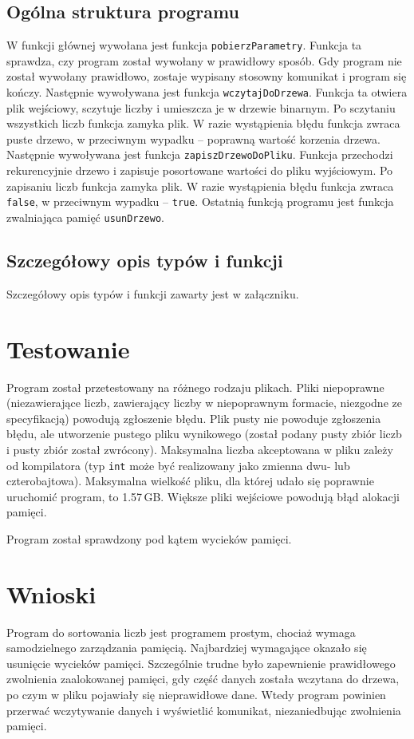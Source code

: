 \documentclass[12pt,a4paper,twoside]{article}
\begin{document}
\subsection{Ogólna struktura programu}
W funkcji głównej wywołana jest funkcja \lstinline|pobierzParametry|.
Funkcja ta sprawdza, czy program został wywołany w prawidłowy sposób. Gdy program nie został wywołany prawidłowo, zostaje wypisany stosowny komunikat i program się kończy.
Następnie wywoływana jest funkcja \lstinline|wczytajDoDrzewa|.
Funkcja ta otwiera plik wejściowy, sczytuje liczby i umieszcza je w drzewie binarnym.
Po sczytaniu wszystkich liczb funkcja zamyka plik.
W razie wystąpienia błędu funkcja zwraca puste drzewo, w przeciwnym wypadku – poprawną wartość korzenia drzewa.
Następnie wywoływana jest funkcja \lstinline|zapiszDrzewoDoPliku|.
Funkcja przechodzi rekurencyjnie drzewo i zapisuje posortowane wartości do pliku wyjściowym. Po zapisaniu liczb funkcja zamyka plik. W razie wystąpienia błędu funkcja zwraca \lstinline!false!, w przeciwnym wypadku -- \lstinline!true!.
Ostatnią funkcją programu jest funkcja zwalniająca pamięć \lstinline|usunDrzewo|.


\subsection{Szczegółowy opis typów i funkcji}

Szczegółowy opis typów i funkcji zawarty jest w załączniku.

 

\section{Testowanie}
Program został przetestowany na różnego rodzaju plikach. Pliki niepoprawne (niezawierające liczb, zawierający liczby w niepoprawnym formacie, niezgodne ze specyfikacją) powodują zgłoszenie błędu. Plik pusty nie powoduje zgłoszenia błędu, ale utworzenie pustego pliku wynikowego (został podany pusty zbiór liczb i pusty zbiór został zwrócony). Maksymalna liczba akceptowana w pliku zależy od kompilatora (typ \lstinline!int! może być realizowany jako zmienna dwu- lub czterobajtowa). Maksymalna wielkość pliku, dla której udało się poprawnie uruchomić program, to \mbox{1.57$\,$GB}. Większe pliki wejściowe powodują błąd alokacji pamięci.

Program został sprawdzony pod kątem wycieków pamięci.


\section{Wnioski}
Program do sortowania liczb jest programem prostym, chociaż wymaga samodzielnego zarządzania pamięcią. Najbardziej wymagające okazało się usunięcie wycieków pamięci. Szczególnie trudne było zapewnienie prawidłowego zwolnienia zaalokowanej pamięci, gdy część danych została wczytana do drzewa, po czym w pliku pojawiały się nieprawidłowe dane. Wtedy program powinien przerwać wczytywanie danych i wyświetlić komunikat, niezaniedbując zwolnienia pamięci.
\end{document}

